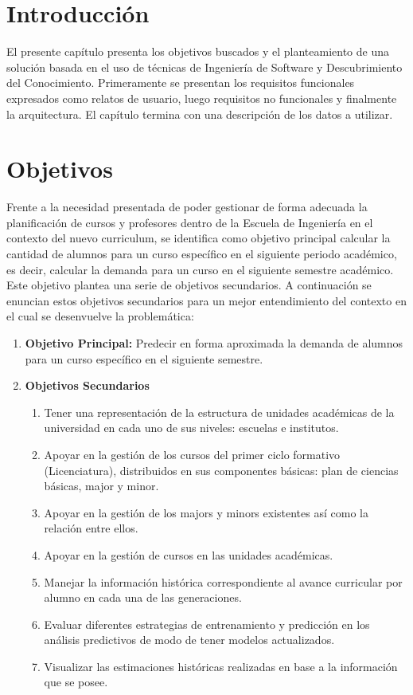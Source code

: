 \section{Introducción \label{sec:cap_three_introduction}}
El presente capítulo presenta los objetivos buscados y el planteamiento de una solución basada en el uso de técnicas de Ingeniería de Software y Descubrimiento del Conocimiento.  Primeramente se presentan los requisitos funcionales expresados como relatos de usuario, luego requisitos no funcionales y finalmente la arquitectura. El capítulo termina con una descripción de los datos a utilizar.

\section{Objetivos \label{sec:goals}}

Frente a la necesidad presentada de poder gestionar de forma adecuada la planificación de cursos y profesores dentro de la Escuela de Ingeniería en el contexto del nuevo curriculum, se identifica como objetivo principal calcular la cantidad de alumnos para un curso específico en el siguiente periodo académico, es decir, calcular la demanda para un curso en el siguiente semestre académico. Este objetivo plantea una serie de objetivos secundarios. A continuación se enuncian estos objetivos secundarios para un mejor entendimiento del contexto en el cual se desenvuelve la problemática:

\begin{enumerate}
	\item \textbf{Objetivo Principal:} Predecir en forma aproximada la demanda de alumnos para un curso específico en el siguiente semestre.
	\item \textbf{Objetivos Secundarios}
		\begin{enumerate}
			\item Tener una representación de la estructura de unidades académicas de la universidad en cada uno de sus niveles: escuelas e institutos.
			\item Apoyar en la gestión de los cursos del primer ciclo formativo (Licenciatura),  distribuidos en sus componentes básicas: plan de ciencias básicas, major y minor.
			\item Apoyar en la gestión de los majors y minors existentes así como la relación entre ellos.
			\item Apoyar en la gestión de cursos en las unidades académicas.
			\item Manejar la información histórica correspondiente al avance curricular por alumno en cada una de las generaciones.
			\item Evaluar diferentes estrategias de entrenamiento y predicción en los análisis predictivos de modo de  tener modelos actualizados.
			\item Visualizar las estimaciones históricas realizadas en base a la información que se posee.
		\end{enumerate}
\end{enumerate}

